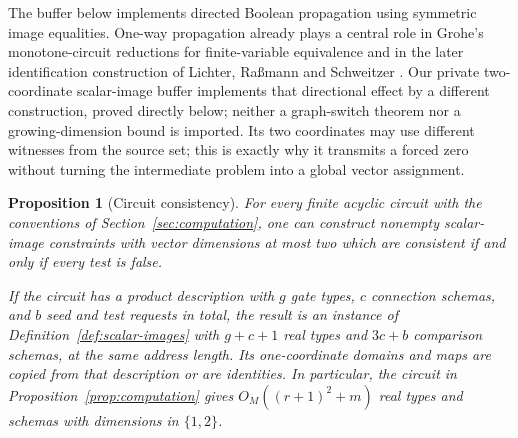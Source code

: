 \documentclass[11pt]{article}
\newtheorem{proposition}[theorem]{Proposition}
\theoremstyle{definition}
\begin{document}
The buffer below implements directed Boolean propagation using symmetric
image equalities. One-way propagation already plays a central role in
Grohe's monotone-circuit reductions for finite-variable equivalence
\citep[author manuscript, Lemma~14 and Section~5.4]{Grohe1999}
and in the later identification
construction of Lichter, Ra{\ss}mann and Schweitzer
\citep[Section~5]{LichterRassmannSchweitzer2025}.
Our private two-coordinate scalar-image buffer implements that directional
effect by a different construction, proved directly below; neither a
graph-switch theorem nor a growing-dimension bound is imported.
Its two coordinates may use different witnesses from
the source set; this is exactly why it transmits a forced zero without
turning the intermediate problem into a global vector assignment.

\begin{proposition}[Circuit consistency]\label{prop:consistency}
For every finite acyclic circuit with the conventions of
Section~\ref{sec:computation}, one can construct nonempty scalar-image
constraints with vector dimensions at most two which are consistent if
and only if every test is false.

If the circuit has a product description with $g$ gate types, $c$
connection schemas, and $b$ seed and test requests in total, the result is
an instance of Definition~\ref{def:scalar-images} with $g+c+1$
real types and $3c+b$ comparison schemas, at the same address length.
Its one-coordinate domains and maps are copied from that description or
are identities. In particular, the circuit in
Proposition~\ref{prop:computation} gives
$O_M((r+1)^2+m)$ real types and schemas with dimensions in $\{1,2\}$.
\end{proposition}
\end{document}
